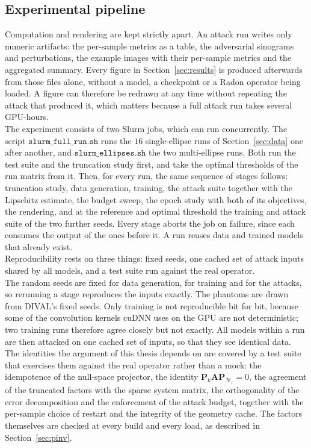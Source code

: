 \documentclass{article}
\numberwithin{equation}{section}
\begin{document}
\subsection{Experimental pipeline}\label{sec:pipeline}
Computation and rendering are kept strictly apart. An attack run writes only
numeric artifacts: the per-sample metrics as a table, the adversarial sinograms
and perturbations, the example images with their per-sample metrics and the aggregated summary. Every figure in
Section~\ref{sec:results} is produced afterwards from those files alone, without a model, a checkpoint or
a Radon operator being loaded. A figure can therefore be redrawn at any time
without repeating the attack that produced it, which matters because a full
attack run takes several GPU-hours.\\
The experiment consists of two Slurm jobs, which can run concurrently. The script
$\texttt{slurm\_full\_run.sh}$ runs the $16$ single-ellipse runs of Section~\ref{sec:data} one after
another, and $\texttt{slurm\_ellipses.sh}$ the two multi-ellipse runs. Both run the test suite and the
truncation study first, and take the optimal thresholds of the run matrix from it. Then, for every run,
the same sequence of stages follows: truncation study, data generation, training, the attack suite
together with the Lipschitz estimate, the budget sweep, the epoch study with both of its objectives, the
rendering, and at the reference and optimal threshold the training and attack suite of the two further
seeds. Every stage aborts the job on failure, since each consumes the output of the ones before it. A run
reuses data and trained models that already exist.\\
Reproducibility rests on three things: fixed seeds, one cached set of attack inputs shared by
all models, and a test suite run against the real operator.\\
The random seeds are fixed for data generation, for training and for the attacks, so rerunning
a stage reproduces the inputs exactly. The phantoms are drawn from DIVAL's fixed seeds.
Only training is not reproducible bit for bit, because some of the convolution kernels cuDNN uses
on the GPU are not deterministic; two training runs therefore agree closely but not exactly.
All models within a run are then attacked on one cached set of inputs, so that
they see identical data.\\
The identities the argument of this thesis depends on are covered by a test suite that
exercises them against the real operator rather than a mock: the idempotence of the null-space
projector, the identity
$\mathbf{P}_k\mathbf{A}\mathbf{P}_{\mathcal{N}_\tau}=0$, the agreement of the truncated
factors with the sparse system matrix, the orthogonality of the error decomposition and the
enforcement of the attack budget, together with the per-sample choice of restart and the
integrity of the geometry cache. The factors themselves are checked at every build and every
load, as described in Section~\ref{sec:pinv}.
\end{document}
